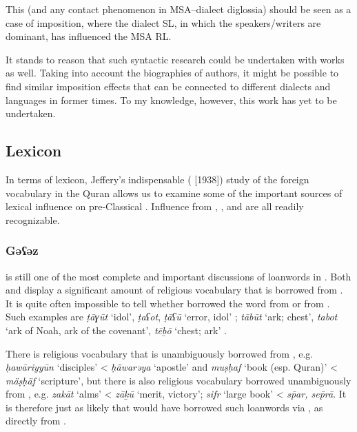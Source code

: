 \documentclass[output=paper]{langsci/langscibook}
\begin{document}
This (and any contact phenomenon in MSA–dialect {diglossia}) should be seen as a case of {imposition}, where the dialect {SL}, in which the speakers/writers are dominant, has influenced the MSA {RL}. 

It stands to reason that such syntactic research could be undertaken with  works as well. Taking into account the biographies of authors, it might be possible to find similar {imposition} effects that can be connected to different dialects and languages in former times. To my knowledge, however, this work has yet to be undertaken.

\subsection{Lexicon}

In terms of lexicon, Jeffery’s indispensable (\citeyear{Jeffrey2007} [1938]) study of the foreign vocabulary in the {Quran} allows us to examine some of the important sources of lexical influence on pre-Classical . Influence from , ,  and  are all readily recognizable. 

\subsubsection{\label{bkm:Ref13224677}Gəʕəz}

\citet{Nöldeke1910} is still one of the most complete and important discussions of  {loanwords} in . Both  and  display a significant amount of religious vocabulary that is borrowed from . It is quite often impossible to tell whether  borrowed the word from  or from . Such examples are \textit{ṭāɣūt} ‘idol’,  \textit{ṭaʕot},  \textit{ṭāʕū} ‘error, idol’ \citep[48]{Nöldeke1910}; \textit{tābūt} ‘ark; chest’,  \textit{tabot} ‘ark of Noah, ark of the covenant’,  \textit{tēḇō} ‘chest; ark’ \citep[49]{Nöldeke1910}.

There is religious vocabulary that is unambiguously borrowed from , e.g. \textit{ḥawāriyyūn} ‘disciples’ <  \textit{ḥäwarəya} ‘apostle’ and \textit{muṣḥaf} ‘book (esp. {Quran})’ <  \textit{mäṣḥäf} ‘scripture’, but there is also religious vocabulary borrowed unambiguously from , e.g. \textit{zakāt} ‘alms’ <  \textit{zāḵū} ‘merit, victory’; \textit{sifr} ‘large book’ <  \textit{sp̄ar, sep̄rā}. It is therefore just as likely that  would have borrowed such  {loanwords} via , as directly from .
\end{document}
